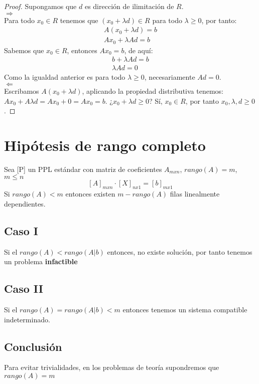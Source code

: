 \documentclass[11pt,fleqn]{book} %
\begin{document}
\begin{proof}
  Supongamos que $d$ es dirección de ilimitación de $R$. \\
  
  $\Rightarrow$ \\
  
  Para todo $x_0 \in R$ tenemos que $(x_0+\lambda d) \in R$ para todo $\lambda \geq 0$, por tanto:
  \begin{eqnarray}
	A(x_0+\lambda d) = b \\
	Ax_0+\lambda A d = b
  \end{eqnarray}
  Sabemos que $x_0 \in R$, entonces $Ax_0=b$, de aquí:
  \begin{eqnarray}
	b+\lambda A d = b \\
	\lambda A d = 0
  \end{eqnarray}
  Como la igualdad anterior es para todo $\lambda \geq 0$, necesariamente $Ad=0$. \\
  $\Leftarrow$ \\
  Escribamos $A(x_0+\lambda d)$, aplicando la propiedad distributiva tenemos: \\
  $Ax_0+A \lambda d=Ax_0+0=Ax_0=b$. ¿$x_0+\lambda d \geq 0$? Sí, $x_0 \in R$, por tanto $x_0, \lambda, d \geq 0$.  
\end{proof}

\section{Hipótesis de rango completo}
Sea [P] un PPL estándar con matriz de coeficientes $A_{mxn}$, $rango(A)=m$, $m\leq n$ \\
$$[A]_{mxn} \cdot [X]_{nx1}=[b]_{mx1}$$
Si $rango(A)<m$ entonces existen $m-rango(A)$ filas linealmente dependientes.
\subsection*{Caso I}
Si el $rango(A)<rango(A|b)$ entonces, no existe solución, por tanto tenemos un problema \textbf{infactible}
\subsection*{Caso II}
Si el $rango(A)=rango(A|b)<m$ entonces tenemos un sistema compatible indeterminado.
\subsection*{Conclusión}
Para evitar trivialidades, en los problemas de teoría supondremos que $rango(A)=m$
\end{document}
